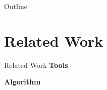 \documentclass[aspectratio=169]{beamer}
\begin{document}
\frame{\titlepage}
\begin{frame}{Outline}
  \footnotesize
  \hfill\parbox[t][7cm][l]{0.9\textwidth}{\tableofcontents}
\end{frame}

\section{Related Work}
  \begin{frame}{Related Work}
    \small
    \onslide<+->
    \textbf{Tools}
    \begin{description}
      \item<+->[\citeyear{isenberg2003}] \citeauthor{isenberg2003} 
      \item<+->[\citeyear{rusinkiewicz2004}] \citeauthor{rusinkiewicz2004} 
    \end{description}
    \onslide<+->
    \textbf{Algorithm}
    \begin{description}
      \item<+->[\citeyear{xie2007}] \citeauthor{xie2007} 
      \item<+->[\citeyear{zhang2010}] \citeauthor{zhang2010} 
    \end{description}
  \end{frame}
\end{document}
